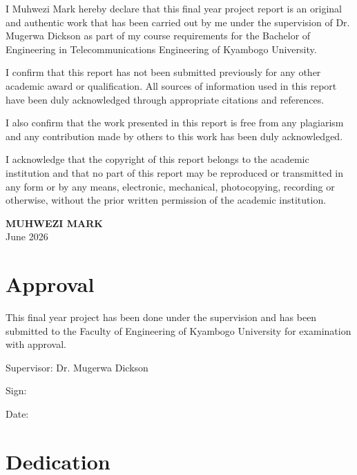 \documentclass[12pt,a4paper,oneside]{report}
\begin{document}
I Muhwezi Mark hereby declare that this final year project report is an original and authentic work that has been carried out by me under the supervision of Dr. Mugerwa Dickson as part of my course requirements for the Bachelor of Engineering in Telecommunications Engineering of Kyambogo University.

I confirm that this report has not been submitted previously for any other academic award or qualification. All sources of information used in this report have been duly acknowledged through appropriate citations and references.

I also confirm that the work presented in this report is free from any plagiarism and any contribution made by others to this work has been duly acknowledged.

I acknowledge that the copyright of this report belongs to the academic institution and that no part of this report may be reproduced or transmitted in any form or by any means, electronic, mechanical, photocopying, recording or otherwise, without the prior written permission of the academic institution.

\vspace{2cm}
\noindent
\textbf{MUHWEZI MARK}\\
June 2026

\clearpage
\chapter*{Approval}

This final year project has been done under the supervision and has been submitted to the Faculty of Engineering of Kyambogo University for examination with approval.

\vspace{1cm}
\noindent Supervisor: Dr. Mugerwa Dickson

\vspace{1.5cm}
\noindent Sign: \underline{\hspace{5cm}}

\vspace{1cm}
\noindent Date: \underline{\hspace{5cm}}

\clearpage
\chapter*{Dedication}
\end{document}
